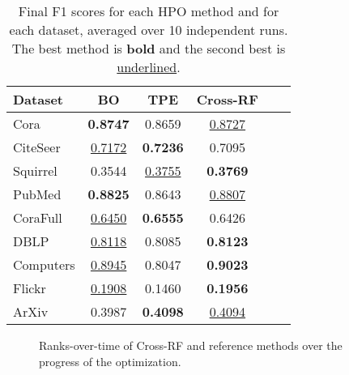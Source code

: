 \begin{table*}
	\caption{Final F1 scores for each HPO method and for each dataset, averaged over 10 independent runs. The best method is \textbf{bold} and the second best is \underline{underlined}.}
	\label{tab:cross-rf-final-scores}
	\centering
	\begin{tabular}{lccccc}
		\toprule
		\textbf{Dataset} & \textbf{BO}        & \textbf{TPE}       & \textbf{Cross-RF}  \\
		\midrule
		Cora             & \textbf{0.8747}    & 0.8659             & \underline{0.8727} \\
		CiteSeer         & \underline{0.7172} & \textbf{0.7236}    & 0.7095             \\
		Squirrel         & 0.3544             & \underline{0.3755} & \textbf{0.3769}    \\
		PubMed           & \textbf{0.8825}    & 0.8643             & \underline{0.8807} \\
		CoraFull         & \underline{0.6450} & \textbf{0.6555}    & 0.6426             \\
		DBLP             & \underline{0.8118} & 0.8085             & \textbf{0.8123}    \\
		Computers        & \underline{0.8945} & 0.8047             & \textbf{0.9023}    \\
		Flickr           & \underline{0.1908} & 0.1460             & \textbf{0.1956}    \\
		ArXiv            & 0.3987             & \textbf{0.4098}    & \underline{0.4094} \\
		\bottomrule
	\end{tabular}
\end{table*}

\begin{figure*}
	\centering
	\resizebox{\linewidth}{!}{%
		
	}
	\caption{Ranks-over-time of Cross-RF and reference methods over the progress of the optimization.}
	\label{fig:cross-rf-ranks}
\end{figure*}
